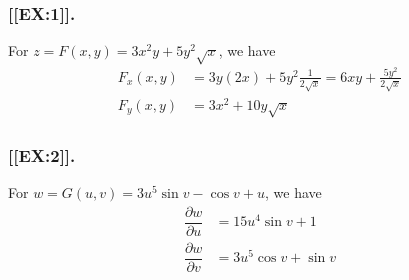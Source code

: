 \subsubsection{[[EX:1]].}
For $z = F(x,y) = 3x^2y + 5y^2 \sqrt{x}$, we have
\begin{align*}
F_x(x,y) &=  3y (2x) + 5y^2 \frac{1}{2 \sqrt{x}} 
          = 6xy + \frac{5y^2}{2 \sqrt{x}} \\
F_y(x,y) &=  3x^2 + 10y \sqrt{x}
\end{align*}



\subsubsection{[[EX:2]].}
For $w = G(u,v) = 3 u^5 \sin{v}  - \cos{v} + u$, we have
\begin{align*}
\dfrac{\partial w}{\partial u} &=   15 u^4 \sin{v} + 1  \\
\dfrac{\partial w}{\partial v} &= 3u^5 \cos{v} + \sin{v}
\end{align*}

